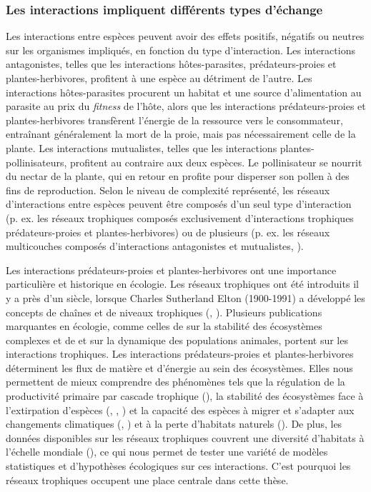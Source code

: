 \subsubsection{Les interactions impliquent différents types d'échange} 

Les interactions entre espèces peuvent avoir des effets positifs, négatifs ou
neutres sur les organismes impliqués, en fonction du type d'interaction. Les
interactions antagonistes, telles que les interactions hôtes-parasites,
prédateurs-proies et plantes-herbivores, profitent à une espèce au détriment de
l'autre. Les interactions hôtes-parasites procurent un habitat et une source
d'alimentation au parasite au prix du \textit{fitness} de l'hôte, alors que les
interactions prédateurs-proies et plantes-herbivores transfèrent l'énergie de la
ressource vers le consommateur, entraînant généralement la mort de la proie,
mais pas nécessairement celle de la plante. Les interactions mutualistes, telles
que les interactions plantes-pollinisateurs, profitent au contraire aux deux
espèces. Le pollinisateur se nourrit du nectar de la plante, qui en retour en
profite pour disperser son pollen à des fins de reproduction. Selon le niveau de
complexité représenté, les réseaux d'interactions entre espèces peuvent être
composés d'un seul type d'interaction (p. ex. les réseaux trophiques composés
exclusivement d'interactions trophiques prédateurs-proies et plantes-herbivores)
ou de plusieurs (p. ex. les réseaux multicouches composés d'interactions
antagonistes et mutualistes, \cite{Pilosof2017Multilayer}). 

Les interactions prédateurs-proies et plantes-herbivores ont une importance
particulière et historique en écologie. Les réseaux trophiques ont été
introduits il y a près d'un siècle, lorsque Charles Sutherland Elton (1900-1991)
a développé les concepts de chaînes et de niveaux trophiques
(\cite{Elton1927Animal}, \cite{Elton1958Ecology}). Plusieurs publications
marquantes en écologie, comme celles de \textcite{May1972Will} sur la stabilité des
écosystèmes complexes et de \textcite{Lotka1925Elements} et
\textcite{Volterra1927Fluctuations} sur la dynamique des populations animales,
portent sur les interactions trophiques. Les interactions prédateurs-proies et
plantes-herbivores déterminent les flux de matière et d'énergie au sein des
écosystèmes. Elles nous permettent de mieux comprendre des phénomènes tels que
la régulation de la productivité primaire par cascade trophique
(\cite{Carpenter1987Regulation}), la stabilité des écosystèmes face à
l'extirpation d'espèces (\cite{Dunne2002Network}, \cite{Srinivasan2007Response},
\cite{Staniczenko2010Structural}) et la capacité des espèces à migrer et
s'adapter aux changements climatiques (\cite{Tylianakis2008Global},
\cite{Gilman2010Framework}) et à la perte d'habitats naturels
(\cite{Evans2013Robustness}). De plus, les données disponibles sur les réseaux
trophiques couvrent une diversité d'habitats à l'échelle mondiale
(\cite{Poisot2021Global}), ce qui nous permet de tester une variété de modèles
statistiques et d'hypothèses écologiques sur ces interactions. C'est pourquoi 
les réseaux trophiques occupent une place centrale dans cette thèse. 

